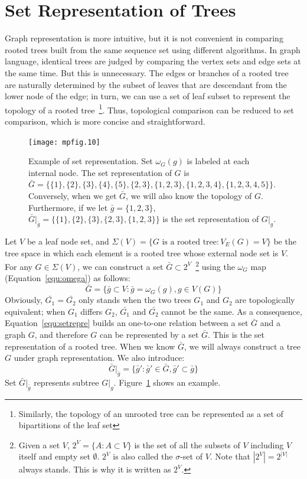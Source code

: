\section{Set Representation of Trees}

Graph representation is more intuitive, but it is not convenient in comparing
rooted trees built from the same sequence set using different algorithms.
In graph language, identical trees are judged by comparing the
vertex sets and edge sets at the same time. But this is unnecessary. The edges or branches of a rooted
tree are naturally determined by the subset of leaves that are descendant from the lower node of the edge;
in turn, we can use a set of leaf subset to represent the topology of a rooted
tree~\footnote{Similarly, the topology of an unrooted tree can be represented as a set of
bipartitions of the leaf set}.
Thus, topological comparison can be reduced to set comparison, which is more
concise and straightforward.

\begin{figure}[!hb]
\begin{center}
\texttt{[image: mpfig.10]}
\caption[Example of set representation]
{Example of set representation. Set $\omega_G(g)$ is labeled at each internal node. The set representation
of $G$ is $\bar{G}=\{\{1\},\{2\},\{3\},\{4\},\{5\},\{2,3\},\{1,2,3\},\{1,2,3,4\},\{1,2,3,4,5\}\}$. Conversely,
when we get $\bar{G}$, we will also know the topology of $G$. Furthermore, if we let $\bar{g}=\{1,2,3\}$,
$\bar{G}|_{\bar{g}}=\{\{1\},\{2\},\{3\},\{2,3\},\{1,2,3\}\}$ is the set representation of $G|_g$.}\label{fig:example-set}
\end{center}
\end{figure}

Let $V$ be a leaf node set, and $\Sigma(V)=\{\mbox{$G$ is a rooted tree}:V_E(G)=V\}$ be the tree space in which each element
is a rooted tree whose external node set is $V$.
For any $G\in\Sigma(V)$, we can construct a set $\bar{G}\subset 2^V$~\footnote{Given a set $V$, $2^V=\{A:A\subset V\}$ is
the set of all the subsets of $V$ including $V$ itself and empty set $\emptyset$. $2^V$ is also called the $\sigma$-set of $V$.
Note that $\left|2^V\right|=2^{|V|}$ always stands. This is why it is written as $2^V$.}
using the $\omega_G$ map (Equation~\ref{equ:omega}) as follows:
\begin{equation}\label{equ:setrepre}
\bar{G}=\{\bar{g}\subset V:\bar{g}=\omega_G(g),g\in V(G)\}
\end{equation}
Obviously, $\bar{G_1}=\bar{G_2}$ only stands when the two trees $G_1$ and $G_2$ are topologically equivalent;
when $G_1$ differs $G_2$, $\bar{G_1}$ and $\bar{G_2}$ cannot be the same.
As a consequence, Equation~\ref{equ:setrepre} builds an one-to-one relation between
a set $\bar{G}$ and a graph $G$, and therefore $G$ can be represented by a set $\bar{G}$.
This is the set representation of a rooted tree.
When we know $\bar{G}$, we will always construct a tree $G$ under graph representation.
We also introduce:
\begin{equation}
\bar{G}|_{\bar{g}}=\{\bar{g}':\bar{g}'\in\bar{G}, \bar{g}'\subset\bar{g}\}
\end{equation}
Set $\bar{G}|_{\bar{g}}$ represents subtree $G|_g$. Figure~\ref{fig:example-set} shows an example.

